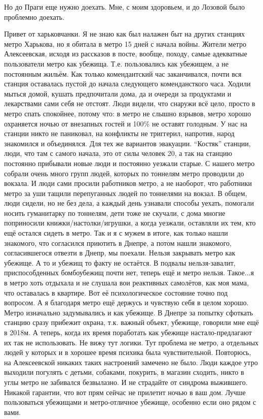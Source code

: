 \begin{itemize}
Но до Праги еще нужно доехать. Мне, с моим здоровьем, и до Лозовой было
проблемно доехать.


Привет от харьковчанки. Я не знаю как был налажен быт на других станциях метро
Харькова, но я обитала в метро 15 дней с начала войны. Жители метро
Алексеевская, исходя из рассказов в посте, вообще, походу, самые адекватные
пользователи метро как убежища. Т.е. пользовались как убежищем, а не постоянным
жильём. Как только комендантский час заканчивался, почти вся станция оставалась
пустой до начала следующего комендансткого часа. Ходили мыться домой, кушать
предпочитали дома, да и очереди за продуктами и лекарствами сами себя не
отстоят. Люди видели, что снаружи всё цело, просто в метро спать спокойнее,
потому что: в метро не слышно взрывов, метро хорошо охраняется ночью от
внезапных гостей и 100\% не оставят голодным. У нас на станции никто не
паниковал, на конфликты не триггерил, напротив, народ знакомился и
объединялся. Для тех же вариантов эвакуации. \enquote{Костяк} станции, люди, что там с
самого начала, это от силы человек 20, а так на станцию постоянно прибывали
новые люди и постоянно уезжали старые. С нашего метро собрали очень много групп
людей, которых по тоннелям метро проводили до вокзала. И люди сами просили
работников метро, а не наоборот, что работники метро за уши тащили перепуганных
людей по тоннелями на вокзал. В общем, люди сидели, но не без дела, а каждый
день узнавали способы уехать, помогали носить гуманитарку по тоннелям, дети
тоже не скучали, с дома многие поприносили книжки/настолки/игрушки, а когда
уезжали, оставляли их тем, кто ещё остался сидеть в метро. Так и я с мужем в
итоге, как только нашли знакомого, что согласился приютить в Днепре, а потом
нашли знакомого, согласившегося отвезти в Днепр, мы поехали. Нельзя закрывать
метро как убежище. А то и убежищ то факту не остаётся. В подвалы
нельзя-завалит, приспособденных бомбоубежищ почти нет, теперь ещё и метро
нельзя. Такое...я в метро хоть отдыхала и не слушала вои реактивных самолётов,
как моя мама, что оставалась в квартире. Вот её психологическое состояние точно
под вопросом. А я благодаря метро ещё держусь и чувствую себя в целом хорошо.
Метро изначально задумывались и как убежище. В Днепре за попытку сфоткать
станцию сразу прибежит охрана, т.к. важный объект, убежище, говорили мне ещё в
2018м. А теперь, когда их время поработать как убежище настало-предлагают их
так не использовать. Не вижу тут логики. Тут проблема не метро, а отдельных
людей у которых и в хорошее время психика была чувствительной. Повторюсь, на
Алексеевской никаких таких настроений замечено не было. Люди каждое утро
выходили погулять с детьми, собаками, покурить, в магазин сходить, никто в углы
метро не забивался безвылазно. И не страдайте от синдрома выжившего. Никакой
гарантии, что вот прям сейчас не прилетит ночью в ваш дом. Лучше пользоваться
убежищами и метро-отличное убежище, особенно если оно рядом с вами.


\end{itemize}
